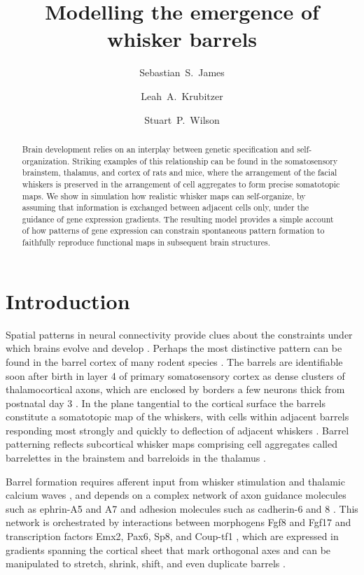 \documentclass[9pt,lineno]{elife}
\title{Modelling the emergence of whisker barrels}
\author[1*]{Sebastian~S.~James}
\author[2]{Leah~A.~Krubitzer}
\author[1]{Stuart~P.~Wilson}
\affil[1]{Department of Psychology, The University of Sheffield, Sheffield, United Kingdom.}
\affil[2]{Center for Neuroscience, The University of California, Davis, United States.}
\newcommand{\mpfour}[1]{\textcolor{colmpfour}{#1}}
\begin{document}
\maketitle

\begin{abstract}
Brain development relies on an interplay between genetic specification and
self-organization. Striking examples of this relationship can be found in the
somatosensory brainstem, thalamus, and cortex of rats and mice, where the
arrangement of the facial whiskers is preserved in the arrangement of cell
aggregates to form precise somatotopic maps. We show in simulation how
realistic whisker maps can self-organize, by assuming that information is
exchanged between adjacent cells only, under the guidance of gene expression
gradients. The resulting model provides a simple account of how patterns of
gene expression can constrain spontaneous pattern formation to faithfully
reproduce functional maps in subsequent brain structures.
\end{abstract}

\section{Introduction}

Spatial patterns in neural connectivity provide clues about the constraints
under which brains evolve and develop \citep{purves_iterated_1992}. Perhaps
the most distinctive pattern can be found in the barrel cortex of many rodent
species \citep{woolsey_structural_1970}. The barrels are identifiable soon
after birth in layer 4 of primary somatosensory cortex as dense clusters of
thalamocortical axons, which are enclosed by borders a few neurons thick from
postnatal day 3 \citep{erzurumlu_development_2012}.
%
In the plane tangential to
the cortical surface the barrels constitute a somatotopic map of the whiskers,
with cells within adjacent barrels responding most strongly and quickly to
deflection of adjacent whiskers \citep{armstrong-james_flow_1992}. Barrel
patterning reflects subcortical whisker maps comprising cell aggregates called
barrelettes in the brainstem and barreloids in the thalamus
\citep{ma_barrelettesarchitectonic_1991,van_der_loos_barreloids_1976}.

Barrel formation requires afferent input from whisker stimulation and thalamic
calcium waves \citep{anton-bolanos_prenatal_2019}, and depends on a complex
network of axon guidance molecules such as ephrin-A5 and A7 and adhesion
molecules such as cadherin-6 and 8
\citep{vanderhaeghen_mapping_2000,miller_epha7-ephrin-a5_2006}.  This network
is orchestrated by interactions between morphogens Fgf8 and Fgf17 and
transcription factors Emx2, Pax6, Sp8, and Coup-tf1
\citep{shimogori_fibroblast_2005,bishop_regulation_2000}, which are expressed
in gradients \mpfour{spanning the cortical sheet} that mark orthogonal axes
and can be manipulated to stretch,
shrink, shift, and even duplicate barrels
\citep{assimacopoulos_fibroblast_2012}.
\end{document}
